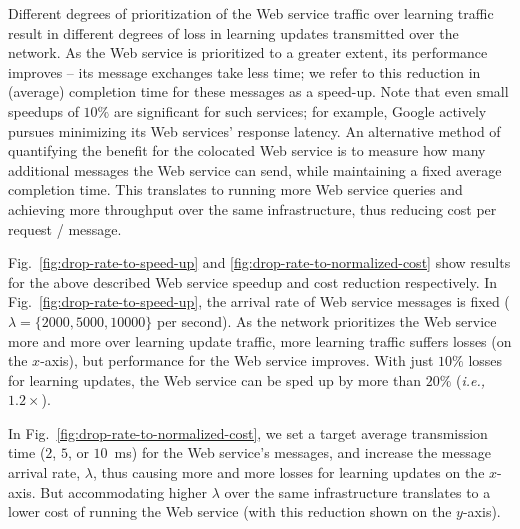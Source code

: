 \documentclass{article}
\begin{document}
Different degrees of prioritization of the Web service traffic over learning traffic result in different degrees of loss in learning updates transmitted over the network. As the Web service is prioritized to a greater extent, its performance improves -- its message exchanges take less time; we refer to this reduction in (average) completion time for these messages as a speed-up. Note that even small speedups of $10\%$ are significant for such services; for example, Google actively pursues minimizing its Web services' response latency. An alternative method of quantifying the benefit for the colocated Web service is to measure how many additional messages the Web service can send, while maintaining a fixed average completion time. This translates to running more Web service queries and achieving more throughput over the same infrastructure, thus reducing cost per request / message.



Fig.~\ref{fig:drop-rate-to-speed-up} and \ref{fig:drop-rate-to-normalized-cost} show results for the above described Web service speedup and cost reduction respectively. In Fig.~\ref{fig:drop-rate-to-speed-up}, the arrival rate of Web service messages is fixed ($\lambda = \{2000, 5000, 10000\}$ per second). As the network prioritizes the Web service more and more over learning update traffic, more learning traffic suffers losses (on the $x$-axis), but performance for the Web service improves. With just $10\%$ losses for learning updates, the Web service can be sped up by more than $20\%$ (\emph{i.e.,} $1.2\times$). 

In Fig.~\ref{fig:drop-rate-to-normalized-cost}, we set a target average transmission time ($2$, $5$, or $10$~ms) for the Web service's messages, and increase the message arrival rate, $\lambda$, thus causing more and more losses for learning updates on the $x$-axis. But accommodating higher $\lambda$ over the same infrastructure translates to a lower cost of running the Web service (with this reduction shown on the $y$-axis).
\end{document}
